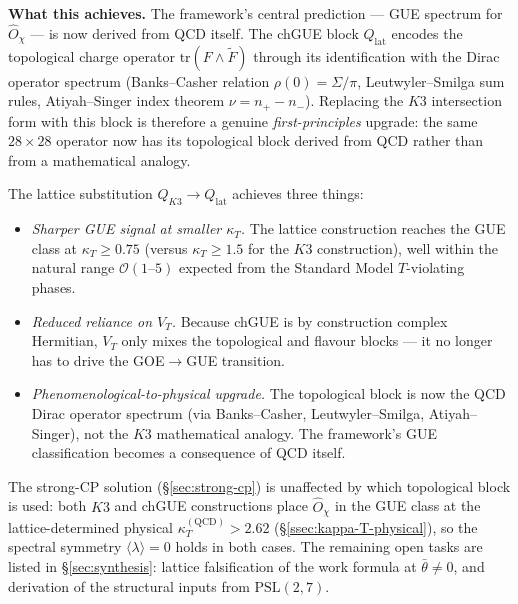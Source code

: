 \documentclass[11pt,a4paper]{article}
\newcommand{\PSL}{\mathrm{PSL}}
\newcommand{\Opchi}{\hat{O}_\chi}
\providecommand{\tr}{}
\renewcommand{\tr}{\mathrm{tr}}
\theoremstyle{plain}
\theoremstyle{definition}
\theoremstyle{remark}
\begin{document}
\medskip\noindent
\textbf{What this achieves.}  The framework's central prediction
--- GUE spectrum for $\Opchi$ --- is now derived from QCD itself.
The chGUE block $Q_{\mathrm{lat}}$ encodes the topological charge
operator $\tr(F \wedge \tilde F)$ through its identification with
the Dirac operator spectrum (Banks--Casher relation
$\rho(0) = \Sigma / \pi$, Leutwyler--Smilga sum rules, Atiyah--Singer
index theorem $\nu = n_+ - n_-$).  Replacing the $K3$
intersection form with this block is therefore a genuine
\emph{first-principles} upgrade: the same $28 \times 28$
operator now has its topological block derived from QCD rather
than from a mathematical analogy.

\begin{keyfind}
The lattice substitution $Q_{K3} \to Q_{\mathrm{lat}}$ achieves three
things:
\begin{itemize}[leftmargin=1.6em,itemsep=2pt]
  \item \emph{Sharper GUE signal at smaller $\kappa_T$.}  The
        lattice construction reaches the GUE class at
        $\kappa_T \ge 0.75$ (versus $\kappa_T \ge 1.5$ for the
        $K3$ construction), well within the natural range
        $\mathcal O(1\text{--}5)$ expected from the Standard Model
        $T$-violating phases.
  \item \emph{Reduced reliance on $V_T$.}  Because chGUE is by
        construction complex Hermitian, $V_T$ only mixes the
        topological and flavour blocks --- it no longer has to drive
        the GOE$\to$GUE transition.
  \item \emph{Phenomenological-to-physical upgrade.}  The
        topological block is now the QCD Dirac operator spectrum
        (via Banks--Casher, Leutwyler--Smilga, Atiyah--Singer),
        not the $K3$ mathematical analogy.  The framework's GUE
        classification becomes a consequence of QCD itself.
\end{itemize}
The strong-CP solution (\S\ref{sec:strong-cp}) is unaffected by
which topological block is used: both $K3$ and chGUE constructions
place $\Opchi$ in the GUE class at the lattice-determined physical
$\kappa_T^{(\mathrm{QCD})} > 2.62$ (\S\ref{ssec:kappa-T-physical}),
so the spectral symmetry $\langle\lambda\rangle = 0$ holds in both
cases.  The remaining open tasks are listed in
\S\ref{sec:synthesis}: lattice falsification of the work formula at
$\bar\theta \neq 0$, and derivation of the structural inputs from
$\PSL(2,7)$.
\end{keyfind}
\end{document}
